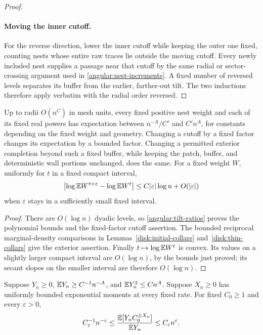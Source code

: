 \begin{proof}
\paragraph{Moving the inner cutoff.}
For the reverse direction, lower the inner cutoff while keeping
the outer one fixed, counting nests whose entire raw traces lie
outside the moving cutoff.  Every newly included nest supplies
a passage near that cutoff by the same radial or sector-crossing
argument used in \eqref{angular:nest-increments}.  A fixed number
of reversed levels separates its buffer from the earlier,
farther-out tilt.  The two inductions therefore apply verbatim
with the radial order reversed.
\end{proof}

\begin{corollary}
\label{angular:polynomial-costs}
Up to radii \(O(n^C)\) in mesh units, every fixed positive
nest weight and each of its fixed real powers has expectation
between \(n^{-A}/C'\) and \(C'n^A\), for constants depending
on the fixed weight and geometry.  Changing a cutoff by a
fixed factor changes its expectation by a bounded factor.
Changing a permitted exterior completion beyond such a fixed
buffer, while keeping the patch, buffer, and deterministic wall
portions unchanged, does the same.  For a fixed weight \(W\), uniformly
for \(t\) in a fixed compact interval,
\[
 \left|\log\mathbb E W^{t+\varepsilon}
              -\log\mathbb E W^t\right|
       \le C|\varepsilon|\log n+O(|\varepsilon|)
\]
when \(\varepsilon\) stays in a sufficiently small fixed
interval.
\end{corollary}

\begin{proof}
There are \(O(\log n)\) dyadic levels, so
\eqref{angular:tilt-ratios} proves the polynomial bounds and
the fixed-factor cutoff assertion.  The bounded reciprocal
marginal-density comparisons in Lemmas~\ref{disk:initial-collars}
and~\ref{disk:thin-collars} give
the exterior assertion.  Finally \(t\mapsto\log\mathbb E W^t\)
is convex.  Its values on a slightly larger compact interval
are \(O(\log n)\), by the bounds just proved; its secant
slopes on the smaller interval are therefore \(O(\log n)\).
\end{proof}

\begin{lemma}
\label{angular:absorption}
Suppose \(Y_n\ge0\),
\(\mathbb E Y_n\ge C^{-1}n^{-A}\), and
\(\mathbb E Y_n^2\le Cn^A\).  Suppose \(X_n\ge0\) has uniformly
bounded exponential moments at every fixed rate.  For fixed
\(C_0\ge1\) and every \(\varepsilon>0\),
\[
 C_\varepsilon^{-1}n^{-\varepsilon}
 \le
 \frac{\mathbb E[Y_n C_0^{\pm X_n}]}{\mathbb E Y_n}
 \le C_\varepsilon n^\varepsilon.
\]
\end{lemma}

